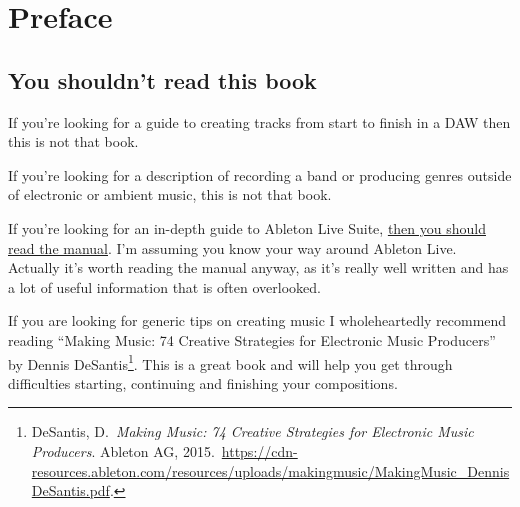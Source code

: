 \documentclass[
  12pt,
  letterpaper,
  oneside,
  open=any]{scrbook}
\renewcommand*\contentsname{Table of contents}
\newcommand\contentsname{Table of contents}
\begin{document}

\renewcommand*\contentsname{Chapters}
{
\hypersetup{linkcolor=}
\setcounter{tocdepth}{1}
\tableofcontents
}

\mainmatter
{}

\chapter*{}\label{index}

\markboth{}{}


\chapter*{Preface}\label{000-Preface}


\section*{You shouldn't read this
book}\label{you-shouldnt-read-this-book}


If you're looking for a guide to creating tracks from start to finish in
a DAW then this is not that book.

If you're looking for a description of recording a band or producing
genres outside of electronic or ambient music, this is not that book.

If you're looking for an in-depth guide to Ableton Live Suite,
\href{https://www.ableton.com/en/manual/welcome-to-live/}{then you
should read the manual}. I'm assuming you know your way around Ableton
Live. Actually it's worth reading the manual anyway, as it's really well
written and has a lot of useful information that is often overlooked.

If you are looking for generic tips on creating music I wholeheartedly
recommend reading ``Making Music: 74 Creative Strategies for Electronic
Music Producers'' by Dennis DeSantis\footnote{DeSantis, D.~\emph{Making
  Music: 74 Creative Strategies for Electronic Music Producers}. Ableton
  AG,
  2015.~\url{https://cdn-resources.ableton.com/resources/uploads/makingmusic/MakingMusic_DennisDeSantis.pdf}.}.
This is a great book and will help you get through difficulties
starting, continuing and finishing your compositions.
\end{document}
